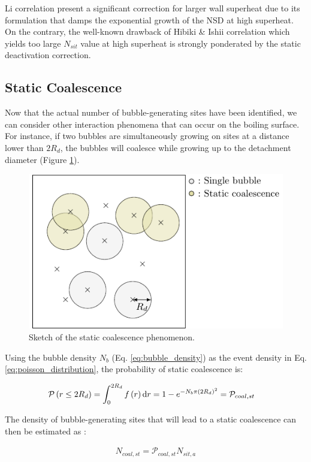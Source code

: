 \npar

Li \etal correlation present a significant correction for larger wall superheat due to its formulation that damps the exponential growth of the NSD at high superheat. On the contrary, the well-known drawback of Hibiki \& Ishii correlation which yields too large $N_{sit}$ value at high superheat is strongly ponderated by the static deactivation correction.


\subsection{Static Coalescence}

Now that the actual number of bubble-generating sites have been identified, we can consider other interaction phenomena that can occur on the boiling surface. For instance, if two bubbles are simultaneously growing on sites at a distance lower than $2R_{d}$, the bubbles will coalesce while growing up to the detachment diameter (Figure \ref{fig:static_coal}). 

\begin{figure}[!h]
\centering
\includegraphics[width=0.5\linewidth]{img/site_interaction/static_coal.pdf}
\caption{Sketch of the static coalescence phenomenon.}
\label{fig:static_coal}
\end{figure}



Using the bubble density $N_{b}$ (Eq. \ref{eq:bubble_density}) as the event density in Eq. \ref{eq:poisson_distribution}, the probability of static coalescence is:

\begin{align}
\mathcal{P}\left( r \leq 2R_{d} \right) &=\int_{0}^{2R_{d}}f\left( r \right) \mathrm{d}r = 1 - e^{-N_{b} \pi \left( 2R_{d} \right)^{2}}=\mathcal{P}_{coal,st}
\label{eq:proba_coal_st}
\end{align}

The density of bubble-generating sites that will lead to a static coalescence can then be estimated as :

\begin{align}
N_{coal,st}=\mathcal{P}_{coal,st}N_{sit,a}
\label{eq:sites_static_coal}
\end{align}

